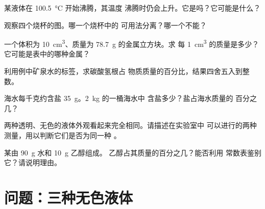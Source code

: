 \begin{exercise}[$\star\star$]\label{exo:g6:pure-substances-and-mixtures:6}
某液体在 \qty{100.5}{\celsius} 开始沸腾，其温度
沸腾时仍会上升。它是吗？它可能是什么？
\end{exercise}

\begin{exercise}[$\star\star$]\label{exo:g6:pure-substances-and-mixtures:7}
观察四个烧杯的图。哪一个烧杯中的
可用法分离？哪一个不能？
\end{exercise}

\begin{exercise}[$\star\star$]\label{exo:g6:pure-substances-and-mixtures:8}
一个体积为 \qty{10}{cm^3}、质量为 \qty{78.7}{g} 的金属立方块。求
每 \qty{1}{cm^3} 的质量是多少？它可能是表中的哪种金属？
\end{exercise}

\begin{exercise}[$\star\star$]\label{exo:g6:pure-substances-and-mixtures:9}
利用例中矿泉水的标签，求碳酸氢根占
物质质量的百分比，结果四舍五入到整数。
\end{exercise}

\begin{exercise}[$\star\star$]\label{exo:g6:pure-substances-and-mixtures:10}
海水每千克约含盐 \qty{35}{g}。\qty{2}{kg} 的一桶海水中
含盐多少？盐占海水质量的
百分之几？
\end{exercise}

\begin{exercise}[$\star\star\star$]\label{exo:g6:pure-substances-and-mixtures:11}
两种透明、无色的液体外观看起来完全相同。请描述在实验室中
可以进行的两种测量，用以判断它们是否为同一种
。
\end{exercise}

\begin{exercise}[$\star\star\star$]\label{exo:g6:pure-substances-and-mixtures:12}
某由 \qty{90}{g} 水和 \qty{10}{g} 乙醇组成。
乙醇占其质量的百分之几？能否利用
常数表鉴别它？请说明理由。
\end{exercise}

\section{问题：三种无色液体}

